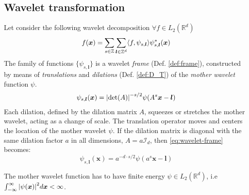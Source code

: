 \subsection{Wavelet transformation}
\label{sub:transform}

Let consider the following wavelet decomposition $\forall f \in L_2(\mathbb{R}^d)$
\begin{equation}
    f(\bm{x}) = \sum_{s \in \mathbb{Z}} \sum_{\bm{l} \in \mathbb{Z}^d} \langle f,\psi_{s,\bm{l}} \rangle \psi^{\ast}_{s,\bm{l}}(\bm{x})
\end{equation}
The family of functions $\{\psi_{s,\bm{l}}\}$ is a wavelet \textit{frame} (Def. \ref{def:frame}), constructed by means of \textit{translations} and \textit{dilations} (Def. \ref{def:D_T}) of the \textit{mother wavelet} function $\psi$.
\begin{equation}
    \psi_{s,\bm{l}}(\bm{x}) = \abs{\det(A)}^{-s/2}\psi(A^s\bm{x} - \bm{l})
\label{eq:wavelet-frame}
\end{equation}
Each dilation, defined by the dilation matrix $A$, squeezes or stretches the mother wavelet, acting as a change of scale. The translation operator moves and centers the location of the mother wavelet $\psi$. If the dilation matrix is diagonal with the same dilation factor $a$ in all dimensions, $A = a \mathcal{I}_d$, then \autoref{eq:wavelet-frame} becomes:
\begin{equation}
    \psi_{s,\bm{l}}(\bm{x}) = a^{-d\cdot s/2}\psi(a^s\bm{x} - \bm{l})
\end{equation}

The mother wavelet function has to have finite energy $\psi \in L_2(\mathbb{R}^d)$, i.e $\int_{-\infty}^{\infty}\abs{\psi(\bm{x})}^2 d\bm{x} < \infty $.\newline

